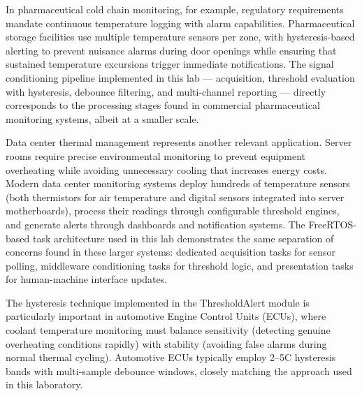 In pharmaceutical cold chain monitoring, for example, regulatory requirements mandate continuous temperature logging with alarm capabilities. Pharmaceutical storage facilities use multiple temperature sensors per zone, with hysteresis-based alerting to prevent nuisance alarms during door openings while ensuring that sustained temperature excursions trigger immediate notifications. The signal conditioning pipeline implemented in this lab --- acquisition, threshold evaluation with hysteresis, debounce filtering, and multi-channel reporting --- directly corresponds to the processing stages found in commercial pharmaceutical monitoring systems, albeit at a smaller scale.

Data center thermal management represents another relevant application. Server rooms require precise environmental monitoring to prevent equipment overheating while avoiding unnecessary cooling that increases energy costs. Modern data center monitoring systems deploy hundreds of temperature sensors (both thermistors for air temperature and digital sensors integrated into server motherboards), process their readings through configurable threshold engines, and generate alerts through dashboards and notification systems. The FreeRTOS-based task architecture used in this lab demonstrates the same separation of concerns found in these larger systems: dedicated acquisition tasks for sensor polling, middleware conditioning tasks for threshold logic, and presentation tasks for human-machine interface updates.

The hysteresis technique implemented in the ThresholdAlert module is particularly important in automotive Engine Control Units (ECUs), where coolant temperature monitoring must balance sensitivity (detecting genuine overheating conditions rapidly) with stability (avoiding false alarms during normal thermal cycling). Automotive ECUs typically employ 2--5\textdegree C hysteresis bands with multi-sample debounce windows, closely matching the approach used in this laboratory.

